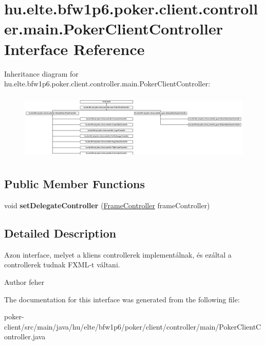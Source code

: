 \hypertarget{interfacehu_1_1elte_1_1bfw1p6_1_1poker_1_1client_1_1controller_1_1main_1_1_poker_client_controller}{}\section{hu.\+elte.\+bfw1p6.\+poker.\+client.\+controller.\+main.\+Poker\+Client\+Controller Interface Reference}
\label{interfacehu_1_1elte_1_1bfw1p6_1_1poker_1_1client_1_1controller_1_1main_1_1_poker_client_controller}
Inheritance diagram for hu.\+elte.\+bfw1p6.\+poker.\+client.\+controller.\+main.\+Poker\+Client\+Controller\+:\begin{figure}[H]
\begin{center}
\leavevmode
\includegraphics[height=3.240741cm]{interfacehu_1_1elte_1_1bfw1p6_1_1poker_1_1client_1_1controller_1_1main_1_1_poker_client_controller}
\end{center}
\end{figure}
\subsection*{Public Member Functions}
\begin{DoxyCompactItemize}
\item 
\hypertarget{interfacehu_1_1elte_1_1bfw1p6_1_1poker_1_1client_1_1controller_1_1main_1_1_poker_client_controller_a5469c66dfe47dea35e66a795aefe582d}{}void {\bfseries set\+Delegate\+Controller} (\hyperlink{classhu_1_1elte_1_1bfw1p6_1_1poker_1_1client_1_1controller_1_1main_1_1_frame_controller}{Frame\+Controller} frame\+Controller)\label{interfacehu_1_1elte_1_1bfw1p6_1_1poker_1_1client_1_1controller_1_1main_1_1_poker_client_controller_a5469c66dfe47dea35e66a795aefe582d}

\end{DoxyCompactItemize}


\subsection{Detailed Description}
Azon interface, melyet a kliens controllerek implementálnak, és ezáltal a controllerek tudnak F\+X\+M\+L-\/t váltani. \begin{DoxyAuthor}{Author}
feher 
\end{DoxyAuthor}


The documentation for this interface was generated from the following file\+:\begin{DoxyCompactItemize}
\item 
poker-\/client/src/main/java/hu/elte/bfw1p6/poker/client/controller/main/Poker\+Client\+Controller.\+java\end{DoxyCompactItemize}
